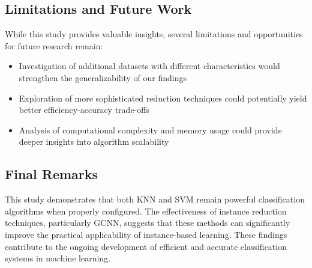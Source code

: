 \subsection{Limitations and Future Work}

While this study provides valuable insights, several limitations and opportunities for future research remain:
\begin{itemize}
    \item Investigation of additional datasets with different characteristics would strengthen the generalizability of our findings
    \item Exploration of more sophisticated reduction techniques could potentially yield better efficiency-accuracy trade-offs
    \item Analysis of computational complexity and memory usage could provide deeper insights into algorithm scalability
\end{itemize}

\subsection{Final Remarks}

This study demonstrates that both KNN and SVM remain powerful classification algorithms when properly configured. The effectiveness of instance reduction techniques, particularly GCNN, suggests that these methods can significantly improve the practical applicability of instance-based learning. These findings contribute to the ongoing development of efficient and accurate classification systems in machine learning.
